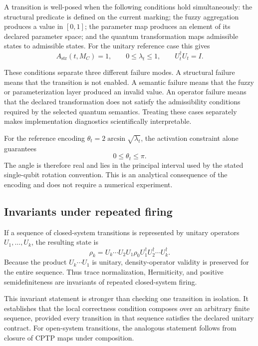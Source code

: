 \documentclass[final,3p,times]{elsarticle}
\begin{document}
A transition is well-posed when the following conditions hold simultaneously: the structural predicate is defined on the current marking; the fuzzy aggregation produces a value in $[0,1]$; the parameter map produces an element of its declared parameter space; and the quantum transformation maps admissible states to admissible states. For the unitary reference case this gives
\begin{equation}
    A_{\mathrm{str}}(t,M_C)=1,
    \qquad
    0\leq\lambda_t\leq1,
    \qquad
    U_t^\dagger U_t=I.
\end{equation}

These conditions separate three different failure modes. A structural failure means that the transition is not enabled. A semantic failure means that the fuzzy or parameterization layer produced an invalid value. An operator failure means that the declared transformation does not satisfy the admissibility conditions required by the selected quantum semantics. Treating these cases separately makes implementation diagnostics scientifically interpretable.

For the reference encoding $\theta_t=2\arcsin\sqrt{\lambda_t}$, the activation constraint alone guarantees
\begin{equation}
    0\leq\theta_t\leq\pi.
\end{equation}
The angle is therefore real and lies in the principal interval used by the stated single-qubit rotation convention. This is an analytical consequence of the encoding and does not require a numerical experiment.

\subsection{Invariants under repeated firing}

If a sequence of closed-system transitions is represented by unitary operators $U_1,\ldots,U_k$, the resulting state is
\begin{equation}
    \rho_k=U_k\cdots U_2U_1\rho_0U_1^\dagger U_2^\dagger\cdots U_k^\dagger.
\end{equation}
Because the product $U_k\cdots U_1$ is unitary, density-operator validity is preserved for the entire sequence. Thus trace normalization, Hermiticity, and positive semidefiniteness are invariants of repeated closed-system firing.

This invariant statement is stronger than checking one transition in isolation. It establishes that the local correctness condition composes over an arbitrary finite sequence, provided every transition in that sequence satisfies the declared unitary contract. For open-system transitions, the analogous statement follows from closure of CPTP maps under composition.
\end{document}
